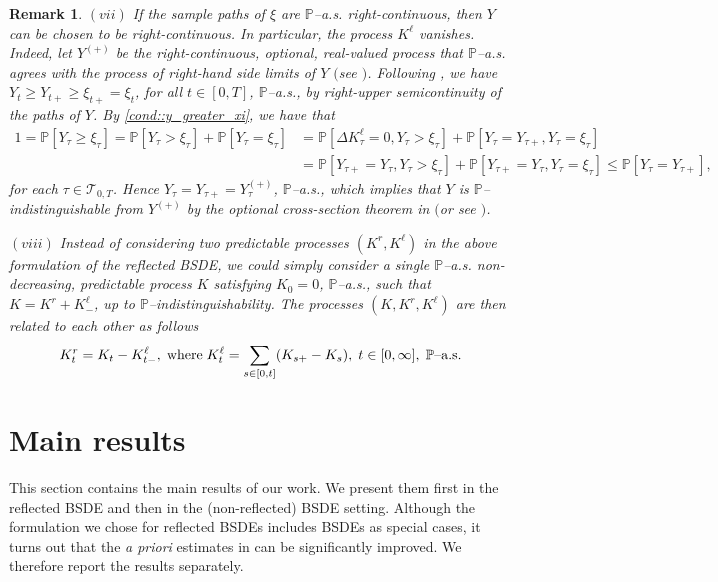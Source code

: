 \documentclass[10pt]{article} %
\newtheorem{remark}[theorem]{Remark}
\newcommand\cT{\mathcal T}
\def \P{\mathbb{P}}
\begin{document}
\begin{remark}
	\medskip
	$(vii)$ If the sample paths of $\xi$ are $\P${\rm--a.s.} right-continuous, then $Y$ can be chosen to be right-continuous. In particular, the process $K^\ell$ vanishes. Indeed, let $Y^{(+)}$ be the right-continuous, optional, real-valued process that $\P$--a.s. agrees with the process of right-hand side limits of $Y$ $($see {\rm\cite[Appendix I, Remark 5(b)]{dellacherie1982probabilities}}$)$. Following {\rm\cite[Remark 3.3]{grigorova2017reflected}}, we have $Y_t \geq Y_{t+} \geq \xi_{t+} = \xi_t$, for all $t \in [0,T]$, $\P${\rm--a.s.}, by right-upper semicontinuity of the paths of $Y$. By \ref{cond::y_greater_xi}, we have that 
		\begin{align*}
			1 = \P[Y_\tau \geq \xi_\tau] = \P[Y_\tau > \xi_\tau] + \P[Y_\tau = \xi_\tau] &= \P[\Delta K^\ell_\tau = 0, Y_\tau > \xi_\tau] + \P[Y_\tau = Y_{\tau+},Y_\tau = \xi_\tau] \\
			&= \P[Y_{\tau+} = Y_\tau, Y_\tau > \xi_\tau] + \P[Y_{\tau+} = Y_\tau, Y_\tau = \xi_\tau] \leq \P[Y_\tau=Y_{\tau+}],
		\end{align*}
		for each $\tau \in \cT_{0,T}$. Hence $Y_\tau = Y_{\tau+} = Y^{(+)}_\tau$, $\P${\rm--a.s.}, which implies that $Y$ is $\P$--indistinguishable from $Y^{(+)}$ by the optional cross-section theorem in {\rm\cite[Theorem 85]{dellacherie1978probabilities}} $($or see {\rm{}}$)$.
		
	\medskip
	$(viii)$ Instead of considering two predictable processes $(K^r,K^\ell)$ in the above formulation of the reflected {\rm BSDE}, we could simply consider a single $\P$--{\rm a.s.} non-decreasing, predictable process $K$  satisfying $K_0 = 0$, $\P$--{\rm a.s.}, such that $K = K^r + K^\ell_-$, up to $\P$--indistinguishability. The processes $(K,K^r,K^\ell)$ are then related to each other as follows
		\begin{equation*}
			K^r_t = K_t- K^\ell_{t-}, \; \text{\rm where} \; K^\ell_t = \sum_{s \in [0,t]} (K_{s+} - K_s), \; t \in [0,\infty], \; \text{$\P$\rm--a.s.}
		\end{equation*}
\end{remark}


\section{Main results}\label{sec::main_results}

This section contains the main results of our work. We present them first in the reflected BSDE and then in the (non-reflected) BSDE setting. Although the formulation we chose for reflected BSDEs includes BSDEs as special cases, it turns out that the \emph{a priori} estimates in  can be significantly improved. We therefore report the results separately.
\end{document}
